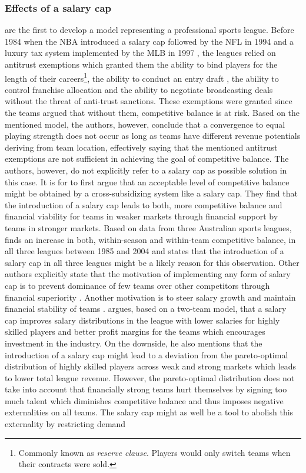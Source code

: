 \documentclass[12pt, a4paper]{article}
\begin{document}
\subsubsection{Effects of a salary cap}

\citet{el-hodiri_economic_1971} are the first to develop a model representing a professional sports league. Before 1984 when the NBA introduced a salary cap followed by the NFL in 1994 and a luxury tax system implemented by the MLB in 1997 \citep[see][]{staudohar_salary_1998}, the leagues relied on antitrust exemptions which granted them the ability to bind players for the length of their careers\footnote{Commonly known as \emph{reserve clause}. Players would only switch teams when their contracts were sold.}, the ability to conduct an entry draft , the ability to control franchise allocation and the ability to negotiate broadcasting deals without the threat of anti-trust sanctions. These exemptions were granted since the teams argued that without them, competitive balance is at risk. Based on the mentioned model, the authors, however, conclude that a convergence to equal playing strength does not occur as long as teams have different revenue potentials deriving from team location, effectively saying that the mentioned antitrust exemptions are not sufficient in achieving the goal of competitive balance. The authors, however, do not explicitly refer to a salary cap as possible solution in this case. It is for \citet{fort_cross-subsidization_1995} to first argue that an acceptable level of competitive balance might be obtained by a cross-subsidizing system like a salary cap. They find that the introduction of a salary cap leads to both, more competitive balance and financial viability for teams in weaker markets through financial support by teams in stronger markets. Based on data from three Australian sports leagues, \citet{booth_comparing_2005} finds an increase in both, within-season and within-team competitive balance, in all three leagues between 1985 and 2004 and states that the introduction of a salary cap in all three leagues might be a likely reason for this observation. Other authors explicitly state that the motivation of implementing any form of salary cap is to prevent dominance of few teams over other competitors through financial superiority \citep{walzel_teamsport_2019,dietl_effect_2009}. Another motivation is to steer salary growth and maintain financial stability of teams \citep{dietl_effect_2009}. \citet{kesenne_impact_2000} argues, based on a two-team model, that a salary cap improves salary distributions in the league with lower salaries for highly skilled players and better profit margins for the teams which encourages investment in the industry. On the downside, he also mentions that the introduction of a salary cap might lead to a deviation from the pareto-optimal distribution of highly skilled players across weak and strong markets which leads to lower total league revenue. However, the pareto-optimal distribution does not take into account that financially strong teams hurt themselves by signing too much talent which diminishes competitive balance and thus imposes negative externalities on all teams. The salary cap might as well be a tool to abolish this externality by restricting demand 
\end{document}
